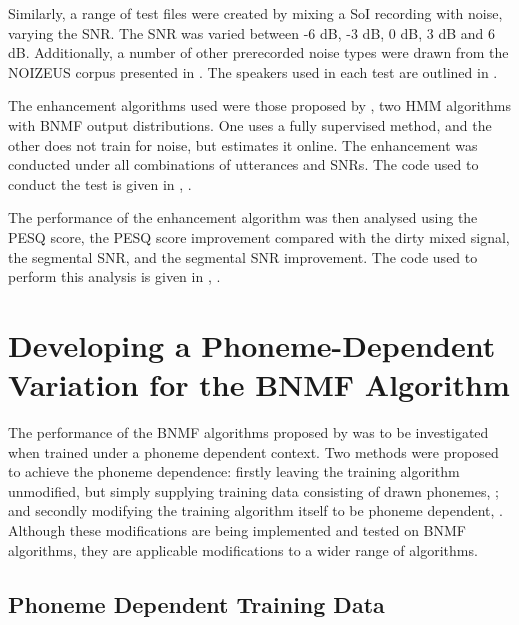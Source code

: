 Similarly, a range of test files were created by mixing a \ac{SoI}
recording with noise, varying the \ac{SNR}. The \ac{SNR} was varied
between -6 dB, -3 dB, 0 dB, 3 dB and 6 dB. Additionally, a number
of other prerecorded noise types were drawn from the NOIZEUS corpus
presented in \citep{Hu2006}. The speakers used in each test are outlined
in .

The enhancement algorithms used were those proposed by \citet{mohammadiha2013supervised},
two \ac{HMM} algorithms with \ac{BNMF} output distributions. One
uses a fully supervised method, and the other does not train for noise,
but estimates it online. The enhancement was conducted under all combinations
of utterances and \acp{SNR}. The code used to conduct the test is
given in , \textit{}.

The performance of the enhancement algorithm was then analysed using
the \ac{PESQ} score, the \ac{PESQ} score improvement compared with
the dirty mixed signal, the segmental \ac{SNR}, and the segmental
\ac{SNR} improvement. The code used to perform this analysis is given
in , \textit{}.


\section{\label{sec:Develop-Phoneme-Dependent}Developing a Phoneme-Dependent
Variation for the \acl{BNMF} Algorithm}

The performance of the \ac{BNMF} algorithms proposed by \citet{mohammadiha2013supervised}
was to be investigated when trained under a phoneme dependent context.
Two methods were proposed to achieve the phoneme dependence: firstly
leaving the training algorithm unmodified, but simply supplying training
data consisting of drawn phonemes, \textbf{};
and secondly modifying the training algorithm itself to be phoneme
dependent, \textbf{}. Although these
modifications are being implemented and tested on \ac{BNMF} algorithms,
they are applicable modifications to a wider range of algorithms.


\clearpage{}


\subsection{\label{sub:Phoneme-Training}Phoneme Dependent Training Data}

